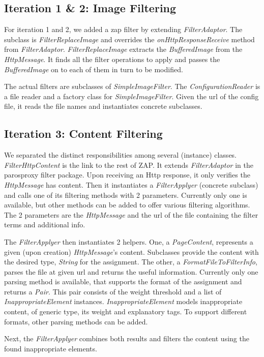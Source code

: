 \subsection{Iteration 1 \& 2: Image Filtering}
For iteration 1 and 2, we added a zap filter by extending \textit{FilterAdaptor}. The subclass is \textit{FilterReplaceImage} and overrides the \textit{onHttpResponseReceive} method from \textit{FilterAdaptor}. \textit{FilterReplaceImage} extracts the \textit{BufferedImage} from the \textit{HttpMessage}. It finds all the filter operations to apply and passes the \textit{BufferedImage} on to each of them in turn to be modified.
\par
The actual filters are subclasses of \textit{SimpleImageFilter}. The \textit{ConfigurationReader} is a file reader and a factory class for \textit{SimpleImageFilter}. Given the url of the config file, it reads the file names and instantiates concrete subclasses.

\subsection{Iteration 3: Content Filtering}
We separated the distinct responsibilities among several (instance) classes. \textit{FilterHttpContent} is the link to the rest of ZAP. It extends \textit{FilterAdaptor} in the parosproxy filter package. Upon receiving an Http response, it only verifies the \textit{HttpMessage} has content. Then it instantiates a \textit{FilterApplyer} (concrete subclass) and calls one of its filtering methods with 2 parameters. Currently only one is available, but other methods can be added to offer various filtering algorithms. The 2 parameters are the \textit{HttpMessage} and the url of the file containing the filter terms and additional info.
\par
The \textit{FilterApplyer} then instantiates 2 helpers. One, a \textit{PageContent}, represents a given (upon creation) \textit{HttpMessage}'s content. Subclasses provide the content with the desired type, \textit{String} for the assignment. The other, a \textit{FormatFileToFilterInfo}, parses the file at given url and returns the useful information. Currently only one parsing method is available, that supports the format of the assignment and returns a \textit{Pair}. This pair consists of the weight threshold and a list of \textit{InappropriateElement} instances. \textit{InappropriateElement} models inappropriate content, of generic type, its weight and explanatory tags. To support different formats, other parsing methods can be added.
\par
Next, the \textit{FilterApplyer} combines both results and filters the content using the found inappropriate elements.
